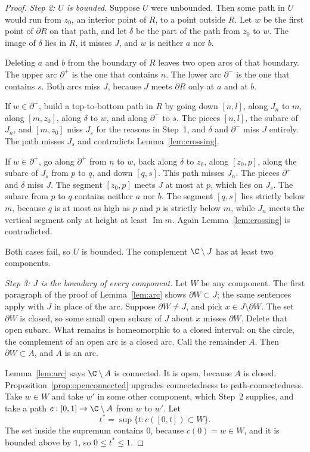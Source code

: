 \begin{proof}
\emph{Step 2: $U$ is bounded.} Suppose $U$ were unbounded. Then some path in $U$ would run from $z_0$, an interior point of $R$, to a point outside $R$. Let $w$ be the first point of $\partial R$ on that path, and let $\delta$ be the part of the path from $z_0$ to $w$. The image of $\delta$ lies in $R$, it misses $J$, and $w$ is neither $a$ nor $b$.

Deleting $a$ and $b$ from the boundary of $R$ leaves two open arcs of that boundary. The upper arc $\partial^+$ is the one that contains $n$. The lower arc $\partial^-$ is the one that contains $s$. Both arcs miss $J$, because $J$ meets $\partial R$ only at $a$ and at $b$.

If $w\in\partial^-$, build a top-to-bottom path in $R$ by going down $[n,l]$, along $J_n$ to $m$, along $[m,z_0]$, along $\delta$ to $w$, and along $\partial^-$ to $s$. The pieces $[n,l]$, the subarc of $J_n$, and $[m,z_0]$ miss $J_s$ for the reasons in Step~1, and $\delta$ and $\partial^-$ miss $J$ entirely. The path misses $J_s$ and contradicts Lemma~\ref{lem:crossing}.

If $w\in\partial^+$, go along $\partial^+$ from $n$ to $w$, back along $\delta$ to $z_0$, along $[z_0,p]$, along the subarc of $J_s$ from $p$ to $q$, and down $[q,s]$. This path misses $J_n$. The pieces $\partial^+$ and $\delta$ miss $J$. The segment $[z_0,p]$ meets $J$ at most at $p$, which lies on $J_s$. The subarc from $p$ to $q$ contains neither $a$ nor $b$. The segment $[q,s]$ lies strictly below $m$, because $q$ is at most as high as $p$ and $p$ is strictly below $m$, while $J_n$ meets the vertical segment only at height at least $\operatorname{Im} m$. Again Lemma~\ref{lem:crossing} is contradicted.

Both cases fail, so $U$ is bounded. The complement $\C\setminus J$ has at least two components.

\emph{Step 3: $J$ is the boundary of every component.} Let $W$ be any component. The first paragraph of the proof of Lemma~\ref{lem:arc} shows $\partial W\subset J$; the same sentences apply with $J$ in place of the arc. Suppose $\partial W\ne J$, and pick $x\in J\setminus\partial W$. The set $\partial W$ is closed, so some small open subarc of $J$ about $x$ misses $\partial W$. Delete that open subarc. What remains is homeomorphic to a closed interval: on the circle, the complement of an open arc is a closed arc. Call the remainder $A$. Then $\partial W\subset A$, and $A$ is an arc.

Lemma~\ref{lem:arc} says $\C\setminus A$ is connected. It is open, because $A$ is closed. Proposition~\ref{prop:openconnected} upgrades connectedness to path-connectedness. Take $w\in W$ and take $w'$ in some other component, which Step~2 supplies, and take a path $c:[0,1]\to\C\setminus A$ from $w$ to $w'$. Let
\[
t^*=\sup\{t:c([0,t])\subset W\}.
\]
The set inside the supremum contains $0$, because $c(0)=w\in W$, and it is bounded above by $1$, so $0\le t^*\le1$.


\end{proof}
